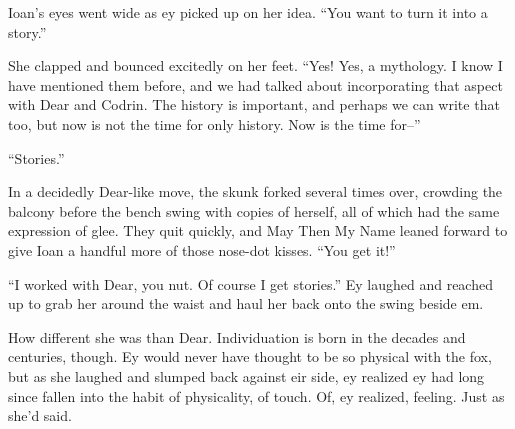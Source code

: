 Ioan's eyes went wide as ey picked up on her idea. ``You want to turn it into a story.''

She clapped and bounced excitedly on her feet. ``Yes! Yes, a mythology. I know I have mentioned them before, and we had talked about incorporating that aspect with Dear and Codrin. The history is important, and perhaps we can write that too, but now is not the time for only history. Now is the time for--''

``Stories.''

In a decidedly Dear-like move, the skunk forked several times over, crowding the balcony before the bench swing with copies of herself, all of which had the same expression of glee. They quit quickly, and May Then My Name leaned forward to give Ioan a handful more of those nose-dot kisses. ``You get it!''

``I worked with Dear, you nut. Of course I get stories.'' Ey laughed and reached up to grab her around the waist and haul her back onto the swing beside em.

How different she was than Dear. Individuation is born in the decades and centuries, though. Ey would never have thought to be so physical with the fox, but as she laughed and slumped back against eir side, ey realized ey had long since fallen into the habit of physicality, of touch. Of, ey realized, feeling. Just as she'd said.
